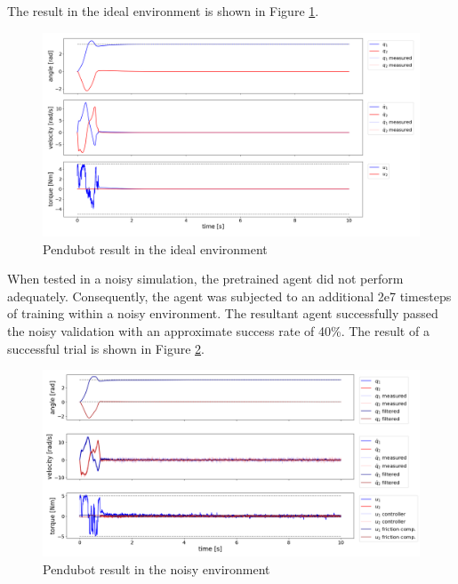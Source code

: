 The result in the ideal environment is shown in Figure \ref{fig:pendubot_ideal_working}.

\begin{figure}[H]
    \centering
    \includegraphics[width=1.0\linewidth]{figures/hardware_result/pendubot_ideal_validation_designC.1.png}
    \caption{Pendubot result in the ideal environment}
    \label{fig:pendubot_ideal_working}
\end{figure}

When tested in a noisy simulation, the pretrained agent did not perform adequately. Consequently, the agent was subjected to an additional 2e7 timesteps of training within a noisy environment. The resultant agent successfully passed the noisy validation with an approximate success rate of 40\%. The result of a successful trial is shown in Figure \ref{fig:pendubot_noisy_working}.

\begin{figure}[H]
    \centering
    \includegraphics[width=1.0\linewidth]{figures/hardware_result/pendubot_noisy_simulation_designC.1.png}
    \caption{Pendubot result in the noisy environment}
    \label{fig:pendubot_noisy_working}
\end{figure}

